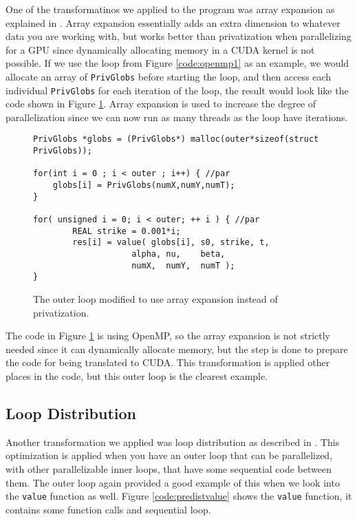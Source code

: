 One of the transformatinos we applied to the program was array expansion as
explained in \cite[Slide 11]{projectslide}. Array expansion essentially adds an
extra dimension to whatever data you are working with, but works better than
privatization when parallelizing for a GPU since dynamically allocating memory
in a CUDA kernel is not possible. If we use the loop from Figure
\ref{code:openmp1} as an example, we would allocate an array of
\texttt{PrivGlobs} before starting the loop, and then access each individual
\texttt{PrivGlobs} for each iteration of the loop, the result would look like
the code shown in Figure \ref{code:arrayexp1}. Array expansion is used to
increase the degree of parallelization since we can now run as many threads as
the loop have iterations.

\begin{figure}[H]
    \begin{lstlisting}
PrivGlobs *globs = (PrivGlobs*) malloc(outer*sizeof(struct PrivGlobs));

for(int i = 0 ; i < outer ; i++) { //par
    globs[i] = PrivGlobs(numX,numY,numT);
}

for( unsigned i = 0; i < outer; ++ i ) { //par
        REAL strike = 0.001*i;
        res[i] = value( globs[i], s0, strike, t,
                    alpha, nu,    beta,
                    numX,  numY,  numT );
}
    \end{lstlisting}
    \caption{The outer loop modified to use array expansion instead of
    privatization.}
    \label{code:arrayexp1}
\end{figure}

The code in Figure \ref{code:arrayexp1} is using OpenMP, so the array expansion
is not strictly needed since it can dynamically allocate memory, but the step is
done to prepare the code for being translated to CUDA. This transformation is
applied other places in the code, but this outer loop is the clearest example.

\subsection{Loop Distribution}

Another transformation we applied was loop distribution as described in
\cite[Slide 13]{projectslide}. This optimization is applied when you have an
outer loop that can be parallelized, with other parallelizable inner loops, that
have some sequential code between them. The outer loop again provided a good
example of this when we look into the \texttt{value} function as well. Figure
\ref{code:predistvalue} shows the \texttt{value} function, it contains some
function calls and sequential loop.


